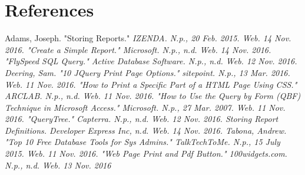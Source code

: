 \documentclass[12pt, draftclsnofoot, onecolumn]{IEEEtran}
\begin{document}
\section{References}	
\begin{thebibliography}{5}

Adams, Joseph. "Storing Reports." \em{IZENDA}. N.p., 20 Feb. 2015. Web. 14 Nov. 2016.
 "Create a Simple Report." \em{Microsoft}. N.p., n.d. Web. 14 Nov. 2016.
"FlySpeed SQL Query." \em{Active Database Software}. N.p., n.d. Web. 12 Nov. 2016.
 Deering, Sam. "10 JQuery Print Page Options." \em{sitepoint}. N.p., 13 Mar. 2016. Web. 11 Nov. 2016. 
"How to Print a Specific Part of a HTML Page Using CSS." \em{ARCLAB}. N.p., n.d. Web. 11 Nov. 2016. 
"How to Use the Query by Form (QBF) Technique in Microsoft Access." \em{Microsoft}. N.p., 27 Mar. 2007. Web. 11 Nov. 2016.
"QueryTree." \em{Capterra}. N.p., n.d. Web. 12 Nov. 2016.
 \em{Storing Report Definitions}. Developer Express Inc, n.d. Web. 14 Nov. 2016.
Tabona, Andrew. "Top 10 Free Database Tools for Sys Admins." \em{TalkTechToMe}. N.p., 15 July 2015. Web. 11 Nov. 2016. 
"Web Page Print and Pdf Button." \em{100widgets.com}. N.p., n.d. Web. 13 Nov. 2016


\end{thebibliography}
\end{document}
